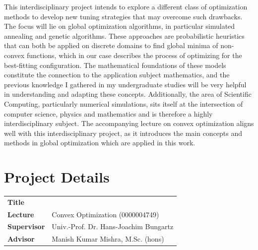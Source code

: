 \documentclass[11pt,parskip=full+]{scrartcl}
\begin{document}
This interdisciplinary project intends to explore a different class of optimization methods to develop new tuning strategies that may overcome such drawbacks. The focus will lie on global optimization algorithms, in particular simulated annealing and genetic algorithms. These approaches are probabilistic heuristics that can both be applied on discrete domains to find global minima of non-convex functions, which in our case describes the process of optimizing for the best-fitting configuration. The mathematical foundations of these models constitute the connection to the application subject mathematics, and the previous knowledge I gathered in my undergraduate studies will be very helpful in understanding and adapting these concepts. Additionally, the area of Scientific Computing, particularly numerical simulations, sits itself at the intersection of computer science, physics and mathematics and is therefore a highly interdisciplinary subject. The accompanying lecture on convex optimization aligns well with this interdisciplinary project, as it introduces the main concepts and methods in global optimization which are applied in this work.


\section*{Project Details}
\vspace*{-1em}

\begin{table}[htpb]
	\noindent
	\begin{tabularx}{\textwidth}{@{}p{3.5cm} X@{}}
		\textbf{\textsf{Title}}      & \thetitle{}                                                                     \\
		\textbf{\textsf{Lecture}}    & Convex Optimization (0000004749)                                                \\
		\textbf{\textsf{Supervisor}} & Univ.-Prof. Dr. Hans-Joachim Bungartz                                           \\
		\textbf{\textsf{Advisor}}    & Manish Kumar Mishra, M.Sc. (hons)                                               \\
	\end{tabularx}
\end{table}
\end{document}
